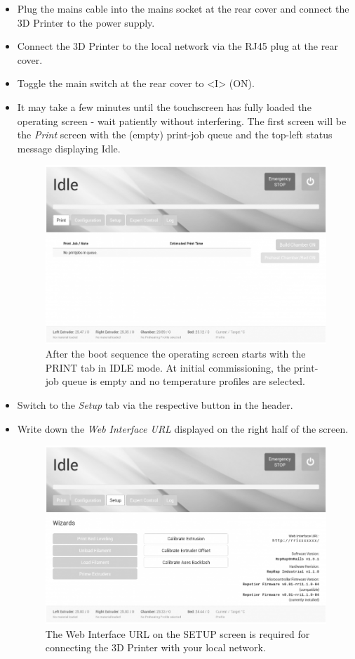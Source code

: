 \begin{itemize}
  \item Plug the mains cable into the mains socket at the rear cover and connect the 
        3D Printer to the power supply.
  \item Connect the 3D Printer to the local network via the RJ45 plug at the rear 
        cover.
  \item Toggle the main switch at the rear cover to <I> (ON).
  \item It may take a few minutes until the touchscreen has fully loaded the 
        operating screen - wait patiently without interfering. The first screen will be the \emph{Print} screen with the (empty) print-job queue and the top-left status message displaying {Idle}.

    \begin{figure}[H]
      \centering
      \includegraphics[width=.7\linewidth]{./img/qsg_emptyprintscreen.png}
      \caption{After the boot sequence the operating screen starts with the PRINT 
               tab in IDLE mode. At initial commissioning, the print-job queue is empty and no temperature profiles are selected.}
    \end{figure}
  
  \item Switch to the \emph{Setup} tab via the respective button in the header.
  \item Write down the \emph{Web Interface URL} displayed on the right half of the 
        screen.

    \begin{figure}[H]
      \centering
      \includegraphics[width=.7\linewidth]{./img/qsg_setupurl_fullscreen.png}
      \caption{The Web Interface URL on the SETUP screen is required for connecting 
               the 3D Printer with your local network.}
    \end{figure}


\end{itemize}
